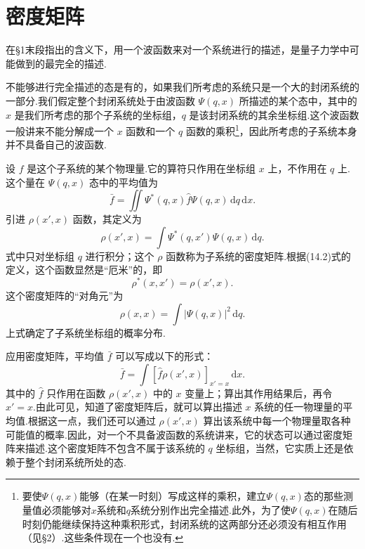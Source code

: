 \section{密度矩阵}

在§1末段指出的含义下，用一个波函数来对一个系统进行的描述，是量子力学中可能做到的最完全的描述.

不能够进行完全描述的态是有的，如果我们所考虑的系统只是一个大的封闭系统的一部分.我们假定整个封闭系统处于由波函数 $\varPsi(q,x)$ 所描述的某个态中，其中的 $x$ 是我们所考虑的那个子系统的坐标组，$q$ 是该封闭系统的其余坐标组.这个波函数一般讲来不能分解成一个 $x$ 函数和一个 $q$ 函数的乘积\footnote{要使$\varPsi(q,x)$能够（在某一时刻）写成这样的乘积，建立$\varPsi(q,x)$态的那些测量值必须能够对$x$系统和$q$系统分别作出完全描述.此外，为了使$\varPsi(q,x)$在随后时刻仍能继续保持这种乘积形式，封闭系统的这两部分还必须没有相互作用（见§2）.这些条件现在一个也没有.}，因此所考虑的子系统本身并不具备自己的波函数.

设 $f$ 是这个子系统的某个物理量.它的算符只作用在坐标组 $x$ 上，不作用在 $q$ 上.这个量在 $\varPsi(q,x)$ 态中的平均值为
\begin{equation}
  \bar{f}=\iint\varPsi^{*}(q,x)\hat{f}\varPsi(q,x)\,\mathrm{d}q\,\mathrm{d}x.
\end{equation}
引进 $\rho(x',x)$ 函数，其定义为
\begin{equation}
  \rho(x',x)=\int\varPsi^{*}(q,x')\varPsi(q,x)\,\mathrm{d}q.
\end{equation}
式中只对坐标组 $q$ 进行积分；这个 $\rho$ 函数称为子系统的密度矩阵.根据(14.2)式的定义，这个函数显然是“厄米”的，即
\begin{equation}
  \rho^{*}(x,x')=\rho(x',x).
\end{equation}
这个密度矩阵的“对角元”为
\begin{equation*}
  \rho(x,x)=\int|\varPsi(q,x)|^{2}\,\mathrm{d}q.
\end{equation*}
上式确定了子系统坐标组的概率分布.

应用密度矩阵，平均值 $\bar{f}$ 可以写成以下的形式：
\begin{equation}
  \bar{f}=\int[\hat{f}\rho(x',x)]_{x'=x}\,\mathrm{d}x.
\end{equation}
其中的 $\hat{f}$ 只作用在函数 $\rho(x',x)$ 中的 $x$ 变量上；算出其作用结果后，再令 $x'=x$.由此可见，知道了密度矩阵后，就可以算出描述 $x$ 系统的任一物理量的平均值.根据这一点，我们还可以通过 $\rho(x',x)$ 算出该系统中每一个物理量取各种可能值的概率.因此，对一个不具备波函数的系统讲来，它的状态可以通过密度矩阵来描述.这个密度矩阵不包含不属于该系统的 $q$ 坐标组，当然，它实质上还是依赖于整个封闭系统所处的态.

